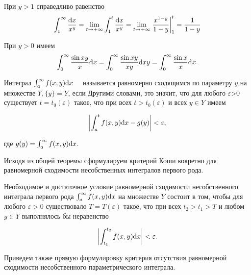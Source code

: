 \begin{example}
При $y>1$ справедливо равенство 
$$\int_1^\infty {\frac {{\rm d}x} {x^y}}=\lim_{t\to +\infty}\int_1^t{\frac {{\rm d}x} {x^y}}=\lim_{t\to +\infty} 
\left.\frac {x^{1-y}} {1-y}\right|_1^t=\frac {1} {1-y}$$
\end{example}
\begin{example}
При $y>0$ имеем
$$\int_0^\infty {\frac {\sin xy} {x} {\rm d}x}=\int_0^\infty {\frac {\sin xy} {xy}{\rm d}xy}=\int_0^\infty {\frac {\sin x} {x}{\rm d}x}.$$
\end{example}
\begin{object}
Интеграл $\int_a^\infty {f(x,y){\rm d}x}\quad $ называется равномерно сходящимся по параметру $y$ на множестве $Y,\{y\}=Y$, если
Другими словами, это значит, что для любого $\varepsilon $>0 существует $t=t_0(\varepsilon)$ такое, что при всех $t>t_0(\varepsilon)$ и всех $y\in Y$ имеем

$$ \left|\int_a^t {f(x,y){\rm d}x}-g(y)\right|<\varepsilon,$$

где $g(y)=\int_a^\infty {f(x,y){\rm d}x}$.
\end{object}
Исходя из общей теоремы сформулируем критерий Коши кокретно для равномерной сходимости несобственных интегралов первого рода.
\begin{theorem} 
Необходимое и достаточное условие равномерной сходимости несобственного интеграла первого рода $\int_a^\infty {f(x,y){\rm d}x}$ на множестве $Y$ состоит в том, чтобы для любого $\varepsilon >0$ существовало $T=T(\varepsilon)$ такое, что при всех $t_2>t_1>T$ и любом $y\in Y$ выполнялось бы неравенство

$$\left|\int_{t_1}^{t_2} {f(x,y){\rm d}x}\right| < \varepsilon.$$
\end{theorem}
Приведем также прямую формулировку критерия отсутствия равномерной сходимости несобственного параметрического интеграла.

